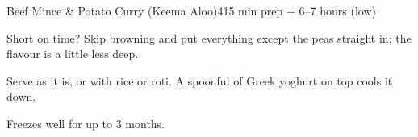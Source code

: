 \begin{recipebox}{Beef Mince \& Potato Curry (Keema Aloo)}{4}{15 min prep + 6--7 hours (low)}
\begin{notelist}
  \item Short on time? Skip browning and put everything except the peas straight in;
        the flavour is a little less deep.
  \item Serve as it is, or with rice or roti. A spoonful of Greek yoghurt on top cools
        it down.
  \item Freezes well for up to 3 months.
\end{notelist}

\end{recipebox}
